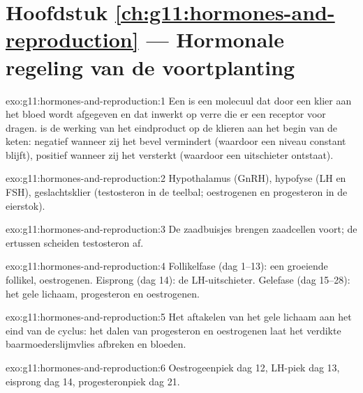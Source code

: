 \section*{Hoofdstuk \ref{ch:g11:hormones-and-reproduction} --- Hormonale regeling van de voortplanting}

\begin{solution}{exo:g11:hormones-and-reproduction:1}
Een  is een molecuul dat door een klier aan het bloed wordt
afgegeven en dat inwerkt op verre  die er een receptor voor dragen.
 is de werking van het eindproduct op de klieren aan het
begin van de keten: negatief wanneer zij het bevel vermindert (waardoor
een niveau constant blijft), positief wanneer zij het versterkt (waardoor
een uitschieter ontstaat).
\end{solution}

\begin{solution}{exo:g11:hormones-and-reproduction:2}
Hypothalamus (GnRH), hypofyse (LH en FSH), geslachtsklier (testosteron in
de teelbal; oestrogenen en progesteron in de eierstok).
\end{solution}

\begin{solution}{exo:g11:hormones-and-reproduction:3}
De zaadbuisjes brengen zaadcellen voort; de  ertussen scheiden
testosteron af.
\end{solution}

\begin{solution}{exo:g11:hormones-and-reproduction:4}
Follikelfase (dag 1--13): een groeiende follikel, oestrogenen. Eisprong
(dag 14): de LH-uitschieter. Gelefase (dag 15--28): het gele lichaam,
progesteron en oestrogenen.
\end{solution}

\begin{solution}{exo:g11:hormones-and-reproduction:5}
Het aftakelen van het gele lichaam aan het eind van de cyclus: het dalen
van progesteron en oestrogenen laat het verdikte baarmoederslijmvlies
afbreken en bloeden.
\end{solution}

\begin{solution}{exo:g11:hormones-and-reproduction:6}
Oestrogeenpiek dag 12, LH-piek dag 13, eisprong dag 14, progesteronpiek
dag 21.
\end{solution}

